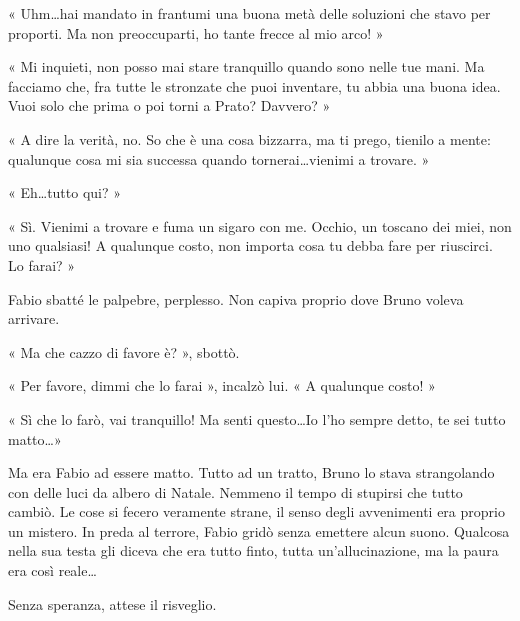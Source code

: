« Uhm\ldots hai mandato in frantumi una buona metà delle soluzioni che stavo per proporti. Ma non preoccuparti, ho tante frecce al mio arco! »

« Mi inquieti, non posso mai stare tranquillo quando sono nelle tue mani. Ma facciamo che, fra tutte le stronzate che puoi inventare, tu abbia una buona idea. Vuoi solo che prima o poi torni a Prato? Davvero? »

« A dire la verità, no. So che è una cosa bizzarra, ma ti prego, tienilo a mente: qualunque cosa mi sia successa quando tornerai\ldots vienimi a trovare. »

« Eh\ldots tutto qui? »

« Sì. Vienimi a trovare e fuma un sigaro con me. Occhio, un toscano dei miei, non uno qualsiasi! A qualunque costo, non importa cosa tu debba fare per riuscirci. Lo farai? »

Fabio sbatté le palpebre, perplesso. Non capiva proprio dove Bruno voleva arrivare.

« Ma che cazzo di favore è? », sbottò.

« Per favore, dimmi che lo farai », incalzò lui. « A qualunque costo! »

« Sì che lo farò, vai tranquillo! Ma senti questo\ldots Io l'ho sempre detto, te sei tutto matto\ldots »

Ma era Fabio ad essere matto. Tutto ad un tratto, Bruno lo stava strangolando con delle luci da albero di Natale. Nemmeno il tempo di stupirsi che tutto cambiò. Le cose si fecero veramente strane, il senso degli avvenimenti era proprio un mistero. In preda al terrore, Fabio gridò senza emettere alcun suono. Qualcosa nella sua testa gli diceva che era tutto finto, tutta un'allucinazione, ma la paura era così reale\ldots

Senza speranza, attese il risveglio.
